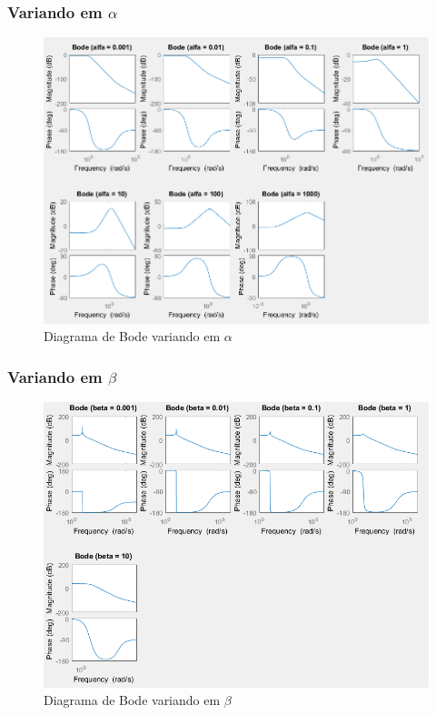 \documentclass[a4paper, 12pt]{article}
\begin{document}
			\subsubsection{Variando em $\alpha$}
			\begin{figure}[!ht]
				\centering
				\includegraphics[scale=0.42]{img/3c_alfa.png}
				\caption{Diagrama de Bode variando em $\alpha$}
			\end{figure}
			\subsubsection{Variando em $\beta$}
			\begin{figure}[!ht]
				\centering
				\includegraphics[scale=0.46]{img/3c_beta.png}
				\caption{Diagrama de Bode variando em $\beta$}
			\end{figure}
\end{document}
